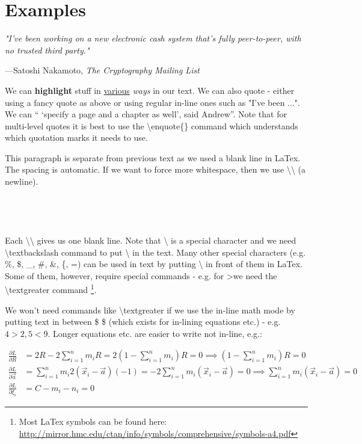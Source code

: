 \chapter{Examples}

\epigraph{\itshape "I've been working on a new electronic cash system that's fully peer-to-peer, with no trusted third party."}{---Satoshi Nakamoto, \textit{The Cryptography Mailing List} \cite{nakamotoFirstPost}}

We can \textbf{highlight} stuff in \underline{various} \textit{ways} in our text. We can also quote - either using a fancy quote as above or using regular in-line ones such as "I've been ..."\cite{nakamotoFirstPost}. 
We can \enquote{ \enquote{specify a page and a chapter as well}, said Andrew}\cite[chapter, p.~215]{wattenhofer2016science}.
Note that for multi-level quotes it is best to use the \textbackslash{}enquote\{\} command which understands which quotation marks it needs to use.

This paragraph is separate from previous text as we used a blank line in LaTex. The spacing is automatic. If we want to force more whitespace, then we use \textbackslash{}\textbackslash{} (a newline).
\\
\\
\\
\\
\\
Each \textbackslash{}\textbackslash{} gives us one blank line. Note that \textbackslash{} is a special character and we need \textbackslash{}textbackslash command to put \textbackslash{} in the text. Many other special characters (e.g. \%, \$, \_, \#, \&, \{, =) can be used in text by putting \textbackslash{} in front of them in LaTex. Some of them, however, require special commands - e.g. for \textgreater we need the \textbackslash{}textgreater command \footnote{Most LaTex symbols can be found here: \url{http://mirror.hmc.edu/ctan/info/symbols/comprehensive/symbols-a4.pdf}}.

We won't need commands like \textbackslash{}textgreater  if  we use the in-line math mode by putting text in between \$ \$ (which exists for in-lining equations etc.) - e.g. $ 4 > 2, 5 < 9 $. Longer equations etc. are easier to write not in-line, e.g.:

\begin{align}
	\label{eq:der_1}
	\frac{\partial L}{\partial R} &= 2R - 2\sum_{i=1}^{n} m_i R = 2(1- \sum_{i=1}^{n} m_i)R = 0
	\implies (1- \sum_{i=1}^{n} m_i)R = 0\\
	\label{eq:der_2}
	\frac{\partial L}{\partial \vec a} &=  \sum_{i=1}^{n} m_i 2(\vec x_i - \vec a)(-1) = -2 \sum_{i=1}^{n} m_i(\vec x_i - \vec a) = 0
	\implies \sum_{i=1}^{n} m_i(\vec x_i - \vec a) = 0\\
	\frac{\partial L}{\partial \xi_i} &= C - m_i - n_i = 0
	\label{eq:der_3}
\end{align}


